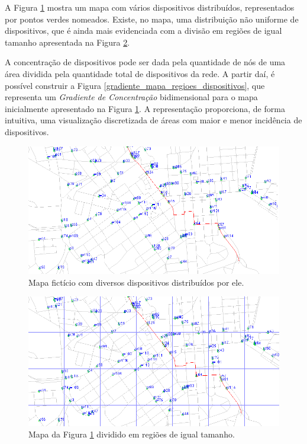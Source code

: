 A Figura \ref{mapa_dispositivos} mostra um mapa com vários dispositivos distribuídos, representados por pontos verdes nomeados. Existe, no mapa, uma distribuição não uniforme de dispositivos, que é ainda mais evidenciada com a divisão em regiões de igual tamanho apresentada na Figura \ref{mapa_regioes_dispositivos}.

A concentração de dispositivos pode ser dada pela quantidade de nós de uma área dividida pela quantidade total de dispositivos da rede. A partir daí, é possível construir a Figura \ref{gradiente_mapa_regioes_dispositivos}, que representa um \emph{Gradiente de Concentração} bidimensional para o mapa inicialmente apresentado na Figura \ref{mapa_dispositivos}. A representação proporciona, de forma intuitiva, uma visualização discretizada de áreas com maior e menor incidência de dispositivos.

\begin{figure}[htp!]
\centering
\includegraphics[width=1.0\textwidth]{figuras/cap_2/secao_2/mapa_dispositivos.png}
\caption{Mapa fictício com diversos dispositivos distribuídos por ele.}
\label{mapa_dispositivos}
\end{figure}

\begin{figure}[htp!]
\centering
\includegraphics[width=1.0\textwidth]{figuras/cap_2/secao_2/mapa_regioes_dispositivos.png}
\caption{Mapa da Figura \ref{mapa_dispositivos} dividido em regiões de igual tamanho.}
\label{mapa_regioes_dispositivos}
\end{figure}

